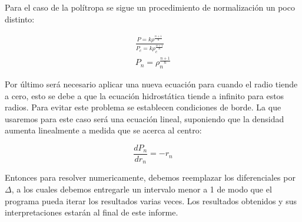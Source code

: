 \documentclass[2pt]{article}
\begin{document}
Para el caso de la polítropa se sigue un procedimiento de normalización un poco distinto:

\begin{subequations}
\begin{align}
\frac{P=k \rho^{\frac{n+1}{n}}}{P_c=k\rho^{\frac{n+1}{n}}_c} \\
P_n=\rho^{\frac{n+1}{n}}_n
\end{align}
\end{subequations}


Por último será necesario aplicar una nueva ecuación para cuando el radio tiende a cero, esto se debe a que la ecuación hidrostática tiende a infinito para estos radios. Para evitar este problema se establecen condiciones de borde. La que usaremos para este caso será una ecuación lineal, suponiendo que la densidad aumenta linealmente a medida que se acerca al centro:

\begin{equation}
\frac{dP_n}{dr_n}=-r_n
\end{equation}

Entonces para resolver numericamente, debemos reemplazar los diferenciales por $\Delta$, a los cuales debemos entregarle un intervalo menor a 1 de modo que el programa pueda iterar los resultados varias veces. Los resultados obtenidos y sus interpretaciones estarán al final de este informe.




\section{}
\end{document}

